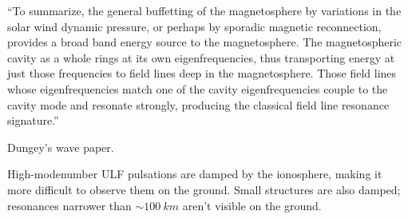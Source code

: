 


``To summarize, the general buffetting of the magnetosphere by variations in the solar wind dynamic pressure, or perhaps by sporadic magnetic reconnection, provides a broad band energy source to the magnetosphere. The magnetospheric cavity as a whole rings at its own eigenfrequencies, thus transporting energy at just those frequencies to field lines deep in the magnetosphere. Those field lines whose eigenfrequencies match one of the cavity eigenfrequencies couple to the cavity mode and resonate strongly, producing the classical field line resonance signature.\cite{hughes_1994}'' 


Dungey's \Alfven wave paper\cite{dungey_1954}. 

High-modenumber ULF pulsations are damped by the ionosphere, making it more difficult to observe them on the ground\cite{hughes_1976}. Small structures are also damped; resonances narrower than $\sim \SI{100}{km}$ aren't visible on the ground. 


